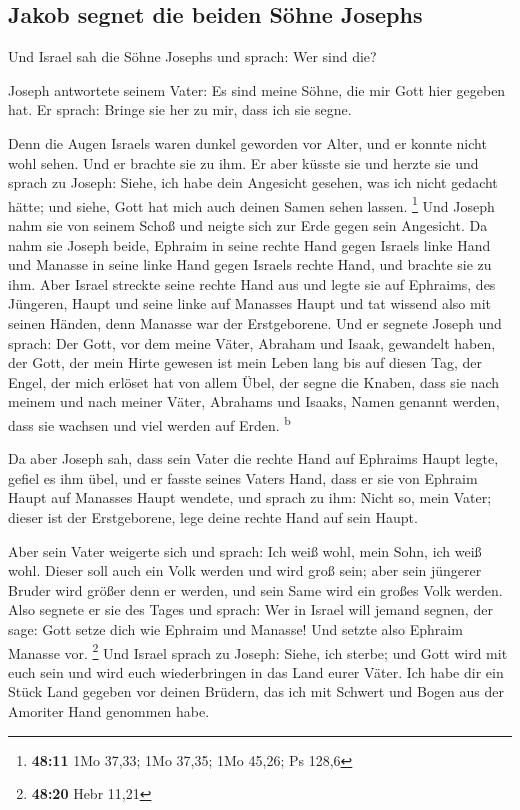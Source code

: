 \hypertarget{jakob-segnet-die-beiden-suxf6hne-josephs}{%
\subsection{Jakob segnet die beiden Söhne
Josephs}\label{jakob-segnet-die-beiden-suxf6hne-josephs}}

 Und Israel sah die Söhne Josephs und sprach: Wer sind
die?

 Joseph antwortete seinem Vater: Es sind meine Söhne, die
mir Gott hier gegeben hat. Er sprach: Bringe sie her zu mir, dass ich
sie segne.

 Denn die Augen Israels waren dunkel geworden vor Alter,
und er konnte nicht wohl sehen. Und er brachte sie zu ihm. Er aber
küsste sie und herzte sie  und sprach zu Joseph: Siehe,
ich habe dein Angesicht gesehen, was ich nicht gedacht hätte; und siehe,
Gott hat mich auch deinen Samen sehen lassen. \footnote{\textbf{48:11}
  1Mo 37,33; 1Mo 37,35; 1Mo 45,26; Ps 128,6}  Und Joseph
nahm sie von seinem Schoß und neigte sich zur Erde gegen sein Angesicht.
 Da nahm sie Joseph beide, Ephraim in seine rechte Hand
gegen Israels linke Hand und Manasse in seine linke Hand gegen Israels
rechte Hand, und brachte sie zu ihm.  Aber Israel
streckte seine rechte Hand aus und legte sie auf Ephraims, des Jüngeren,
Haupt und seine linke auf Manasses Haupt und tat wissend also mit seinen
Händen, denn Manasse war der Erstgeborene.  Und er
segnete Joseph und sprach: Der Gott, vor dem meine Väter, Abraham und
Isaak, gewandelt haben, der Gott, der mein Hirte gewesen ist mein Leben
lang bis auf diesen Tag,  der Engel, der mich erlöset hat
von allem Übel, der segne die Knaben, dass sie nach meinem und nach
meiner Väter, Abrahams und Isaaks, Namen genannt werden, dass sie
wachsen und viel werden auf Erden. \textsuperscript{b}

 Da aber Joseph sah, dass sein Vater die rechte Hand auf
Ephraims Haupt legte, gefiel es ihm übel, und er fasste seines Vaters
Hand, dass er sie von Ephraim Haupt auf Manasses Haupt wendete,
 und sprach zu ihm: Nicht so, mein Vater; dieser ist der
Erstgeborene, lege deine rechte Hand auf sein Haupt.

 Aber sein Vater weigerte sich und sprach: Ich weiß wohl,
mein Sohn, ich weiß wohl. Dieser soll auch ein Volk werden und wird groß
sein; aber sein jüngerer Bruder wird größer denn er werden, und sein
Same wird ein großes Volk werden.  Also segnete er sie
des Tages und sprach: Wer in Israel will jemand segnen, der sage: Gott
setze dich wie Ephraim und Manasse! Und setzte also Ephraim Manasse vor.
\footnote{\textbf{48:20} Hebr 11,21}  Und Israel sprach
zu Joseph: Siehe, ich sterbe; und Gott wird mit euch sein und wird euch
wiederbringen in das Land eurer Väter.  Ich habe dir ein
Stück Land gegeben vor deinen Brüdern, das ich mit Schwert und Bogen aus
der Amoriter Hand genommen habe.

